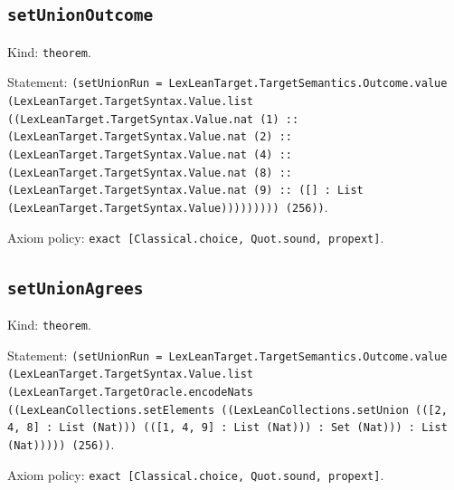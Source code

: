 \documentclass[11pt]{article}
\begin{document}
\subsection*{\texttt{setUnionOutcome}}
\noindent Kind: \texttt{theorem}.\par
\noindent Statement: \texttt{(setUnionRun = LexLeanTarget.TargetSemantics.Outcome.value (LexLeanTarget.TargetSyntax.Value.list ((LexLeanTarget.TargetSyntax.Value.nat (1) :: (LexLeanTarget.TargetSyntax.Value.nat (2) :: (LexLeanTarget.TargetSyntax.Value.nat (4) :: (LexLeanTarget.TargetSyntax.Value.nat (8) :: (LexLeanTarget.TargetSyntax.Value.nat (9) :: ([] : List (LexLeanTarget.TargetSyntax.Value))))))))) (256))}.\par
\noindent Axiom policy: \texttt{exact [Classical.choice, Quot.sound, propext]}.\par
\subsection*{\texttt{setUnionAgrees}}
\noindent Kind: \texttt{theorem}.\par
\noindent Statement: \texttt{(setUnionRun = LexLeanTarget.TargetSemantics.Outcome.value (LexLeanTarget.TargetSyntax.Value.list (LexLeanTarget.TargetOracle.encodeNats ((LexLeanCollections.setElements ((LexLeanCollections.setUnion (([2, 4, 8] : List (Nat))) (([1, 4, 9] : List (Nat))) : Set (Nat))) : List (Nat))))) (256))}.\par
\noindent Axiom policy: \texttt{exact [Classical.choice, Quot.sound, propext]}.\par
\end{document}
